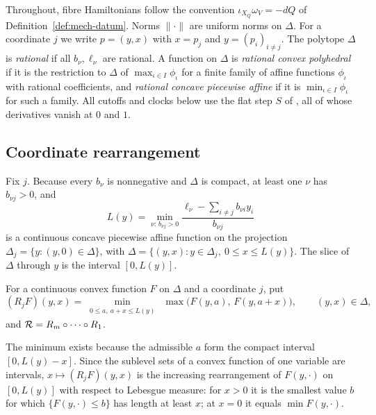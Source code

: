 Throughout, fibre Hamiltonians follow the convention $\iota_{X_Q}\omega_V=-dQ$ of
Definition~\ref{def:mech-datum}. Norms $\|\cdot\|$ are uniform norms on $\Delta$. For a coordinate $j$ we write
$p=(y,x)$ with $x=p_j$ and $y=(p_i)_{i\ne j}$. The polytope $\Delta$ is \emph{rational} if all $b_\nu,\ell_\nu$ are
rational. A function on $\Delta$ is \emph{rational convex polyhedral} if it is the restriction to $\Delta$ of
$\max_{\iota\in I}\phi_\iota$ for a finite family of affine functions $\phi_\iota$ with rational coefficients, and
\emph{rational concave piecewise affine} if it is $\min_{\iota\in I}\phi_\iota$ for such a family. All cutoffs and
clocks below use the flat step $S$ of , all of whose derivatives vanish at $0$ and
$1$.

\subsection{Coordinate rearrangement}\label{sec:cmp-rearrangement}

Fix $j$. Because every $b_\nu$ is nonnegative and $\Delta$ is compact, at least one $\nu$ has $b_{\nu j}>0$, and
\[
 L(y)=\min_{\nu:\,b_{\nu j}>0}\frac{\ell_\nu-\sum_{i\ne j}b_{\nu i}y_i}{b_{\nu j}}
\]
is a continuous concave piecewise affine function on the projection $\Delta_j=\{y:(y,0)\in\Delta\}$, with
$\Delta=\{(y,x):y\in\Delta_j,\ 0\le x\le L(y)\}$. The slice of $\Delta$ through $y$ is the interval $[0,L(y)]$.

\begin{definition}\label{def:cmp-rearrangement}
For a continuous convex function $F$ on $\Delta$ and a coordinate $j$, put
\[
 (R_jF)(y,x)=\min_{\substack{0\le a,\ a+x\le L(y)}}\ \max\bigl(F(y,a),\,F(y,a+x)\bigr),
 \qquad (y,x)\in\Delta,
\]
and $\mathcal{R}=R_m\circ\dots\circ R_1$.
\end{definition}

The minimum exists because the admissible $a$ form the compact interval $[0,L(y)-x]$. Since the sublevel sets of
a convex function of one variable are intervals, $x\mapsto(R_jF)(y,x)$ is the increasing rearrangement of
$F(y,\cdot)$ on $[0,L(y)]$ with respect to Lebesgue measure: for $x>0$ it is the smallest value $b$ for which
$\{F(y,\cdot)\le b\}$ has length at least $x$; at $x=0$ it equals $\min F(y,\cdot)$.

